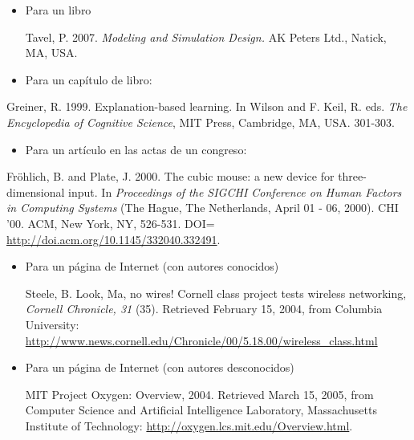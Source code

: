 \documentclass[a4paper]{article}
\newcommand\liststyleLiii{%
\renewcommand\labelitemi{{\textbullet}}
\renewcommand\labelitemii{${\circ}$}
\renewcommand\labelitemiii{${\blacksquare}$}
\renewcommand\labelitemiv{{\textbullet}}
}
\newcommand\liststyleLiv{%
\renewcommand\labelitemi{{\textbullet}}
\renewcommand\labelitemii{${\circ}$}
\renewcommand\labelitemiii{${\blacksquare}$}
\renewcommand\labelitemiv{{\textbullet}}
}
\newcommand\liststyleLv{%
\renewcommand\labelitemi{{\textbullet}}
\renewcommand\labelitemii{${\circ}$}
\renewcommand\labelitemiii{${\blacksquare}$}
\renewcommand\labelitemiv{{\textbullet}}
}
\newcommand\liststyleLvi{%
\renewcommand\labelitemi{{\textbullet}}
\renewcommand\labelitemii{${\circ}$}
\renewcommand\labelitemiii{${\blacksquare}$}
\renewcommand\labelitemiv{{\textbullet}}
}
\begin{document}
\liststyleLiii
\begin{itemize}
\item Para un libro

Tavel, P. 2007. \textit{Modeling and Simulation Design.} AK Peters Ltd., Natick, MA, USA.
\end{itemize}
\liststyleLiv
\begin{itemize}
\item Para un cap\'itulo de libro:
\end{itemize}
Greiner, R. 1999. Explanation-based learning. In Wilson and F. Keil, R. eds. \textit{The Encyclopedia of Cognitive
Science}, MIT Press, Cambridge, MA, USA. 301-303.

\liststyleLv
\begin{itemize}
\item Para un art\'iculo en las actas de un congreso:
\end{itemize}
Fr\"ohlich, B. and Plate, J. 2000. The cubic mouse: a new device for three-dimensional input. In \textit{Proceedings of
the SIGCHI Conference on Human Factors in Computing Systems} (The Hague, The Netherlands, April 01 - 06, 2000). CHI
'00. ACM, New York, NY, 526-531. DOI= \url{http://doi.acm.org/10.1145/332040.332491}.

\liststyleLvi
\begin{itemize}
\item Para un p\'agina de Internet (con autores conocidos)

Steele, B. Look, Ma, no wires! Cornell class project tests wireless networking, \textit{Cornell Chronicle, 31 }(35).
Retrieved February 15, 2004, from Columbia University:
\url{http://www.news.cornell.edu/Chronicle/00/5.18.00/wireless_class.html}
\item Para un p\'agina de Internet (con autores desconocidos)

MIT Project Oxygen: Overview, 2004. Retrieved March 15, 2005, from Computer Science and Artificial Intelligence
Laboratory, Massachusetts Institute of Technology: \url{http://oxygen.lcs.mit.edu/Overview.html}. \
\end{itemize}

\bigskip

\clearpage\clearpage\pagestyle{plain}
\thispagestyle{FirstPage}


\bigskip
\end{document}
